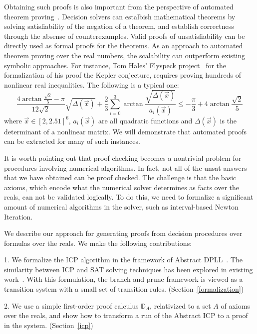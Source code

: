 \documentclass{llncs}
\begin{document}
Obtaining such proofs is also important from the perspective of automated theorem proving~\cite{DBLP:conf/lics/GaoAC12,DBLP:conf/cade/GaoAC12}. Decision solvers can estalbish mathematical theorems by solving satisfiability of the negation of a theorem, and establish correctness through the absense of counterexamples. Valid proofs of unsatisfiability can be directly used as formal proofs for the theorems. As an approach to automated theorem proving over the real numbers, the scalability can outperform existing symbolic approaches. For instance, Tom Hales' Flyspeck project~\cite{DBLP:conf/dagstuhl/Hales05,DBLP:journals/dcg/HalesHMNOZ10} for the formalization of his proof the Kepler conjecture, requires proving hundreds of nonlinear real inequalities. The following is a typical one:
$$\frac{4\arctan\frac{\sqrt 2}{5}-\pi}{12\sqrt2}\sqrt{\Delta(\vec x)}+\frac{2}{3}\sum_{i=0}^3\arctan\frac{\sqrt{\Delta(\vec x)}}{a_i(\vec x)}\leq -\frac{\pi}{3}+4\arctan\frac{\sqrt 2}{5}$$
where $\vec x\in [2, 2.51]^6$,  $a_i(\vec x)$ are all quadratic functions and $\Delta(\vec x)$ is the determinant of a nonlinear matrix. We will demonstrate that automated proofs can be extracted for many of such instances. 

It is worth pointing out that proof checking becomes a nontrivial problem for procedures involving numerical algorithms. In fact, not all of the {\sf unsat} answers that we have obtained can be proof checked. The challenge is that the basic axioms, which encode what the numerical solver determines as facts over the reals, can not be validated logically. To do this, we need to formalize a significant amount of numerical algorithms in the solver, such as interval-based Newton Iteration.

We describe our approach for generating proofs from decision procedures over formulas over the reals. We make the following contributions:

1. We formalize the ICP algorithm in the framework of Abstract DPLL~\cite{DBLP:journals/jacm/NieuwenhuisOT06}. The similarity between ICP and SAT solving techniques has been explored in existing work~\cite{HySAT}. With this formulation, the branch-and-prune framework is viewed as a transition system with a small set of transition rules. (Section~\ref{formalization})

2. We use a simple first-order proof calculus $\mathbb{D}_A$, relativized to a set $A$ of axioms over the reals, and show how to transform a run of the Abstract ICP to a proof in the system. (Section~\ref{icp})
\end{document}
